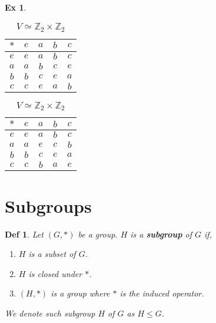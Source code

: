 \documentclass[paper=a4, fontsize=11pt]{scrartcl}
\newcommand{\Zn}[1]{\mathbb{Z}_{#1}}
\newtheorem{definition}{Def}
\newtheorem{example}{Ex}
\begin{document}
\begin{example}
\begin{enumerate}
		\begin{table}[!htb]
			\begin{minipage}{.5\linewidth}
				\centering
					\begin{tabular}{|c|c|c|c|c|}
					\hline
					$\ast$ & $e$ & $a$ & $b$ & $c$ \\ \hline
					$e$    & $e$ & $a$ & $b$ & $c$ \\ \hline
					$a$    & $a$ & $b$ & $c$ & $e$ \\ \hline
					$b$    & $b$ & $c$ & $e$ & $a$ \\ \hline
					$c$    & $c$ & $e$ & $a$ & $b$ \\ \hline
					\end{tabular}
				\caption{$\Zn{4}$}
			\end{minipage}%
			\begin{minipage}{.5\linewidth}
				\centering
				\begin{tabular}{|c|c|c|c|c|}
					\hline
					$\ast$ & $e$ & $a$ & $b$ & $c$ \\ \hline
					$e$    & $e$ & $a$ & $b$ & $c$ \\ \hline
					$a$    & $a$ & $e$ & $c$ & $b$ \\ \hline
					$b$    & $b$ & $c$ & $e$ & $a$ \\ \hline
					$c$    & $c$ & $b$ & $a$ & $e$ \\ \hline
				\end{tabular}
				\caption{$V\simeq \Zn{2}\times\Zn{2}$}
			\end{minipage} 
		\end{table}
	\end{enumerate}
\end{example}

\vspace{0.25in}

\section{Subgroups}
\vspace{0.25in}

\begin{definition}
	Let $(G,\ast)$ be a group. $H$ is a \textbf{subgroup} of $G$ if, 
	\begin{enumerate}
		\item $H$ is a subset of $G$.
		\item $H$ is closed under $\ast$.
		\item $(H,\ast)$ is a group where $\ast$ is the induced operator. 
	\end{enumerate}
	We denote such subgroup $H$ of $G$ as $H \leqslant G$.\\
\end{definition}
\end{document}
